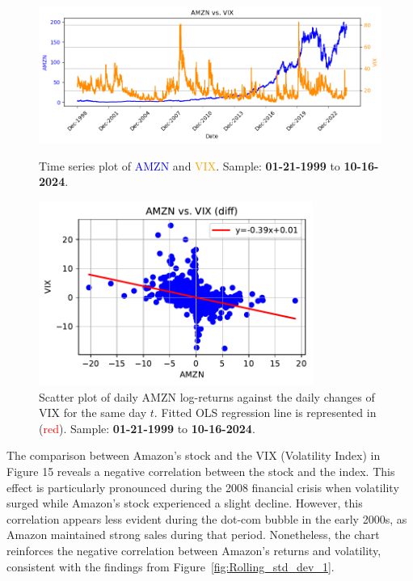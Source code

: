 \documentclass{article}
\begin{document}
\begin{figure}[H]
    \begin{minipage}{0.46\textwidth}
        \centering
        \includegraphics[width=1\textwidth]{Img/Fact8.pdf}
        \caption{Time series plot of \textcolor{blue}{AMZN} and \textcolor{orange}{VIX}. Sample: \textbf{01-21-1999} to \textbf{10-16-2024}.}
        \label{fig:Rolling_std_dev_3}
    \end{minipage}
    \centering
    \hspace{0.01\textwidth}
    \begin{minipage}{0.46\textwidth}
        \centering
        \includegraphics[width=0.8\textwidth]{Img/Fact_8_3AMZN_.pdf}
        \caption{Scatter plot of daily AMZN log-returns against the daily changes of VIX for the same day $t$. 
        Fitted OLS regression line is represented in (\textcolor{red}{red}).
        Sample: \textbf{01-21-1999} to \textbf{10-16-2024}.}
        \label{fig:Rolling_std_dev}
    \end{minipage}
\end{figure}
\noindent The comparison between Amazon's stock and the VIX (Volatility Index) in Figure 15 reveals a negative correlation between the stock and the index. 
This effect is particularly pronounced during the 2008 financial crisis when volatility surged while Amazon's stock experienced a slight decline. 
However, this correlation appears less evident during the dot-com bubble in the early 2000s, as Amazon maintained strong sales during that period. 
Nonetheless, the chart reinforces the negative correlation between Amazon's returns and volatility, 
consistent with the findings from Figure~\ref{fig:Rolling_std_dev_1}.
\appendix
\end{document}
